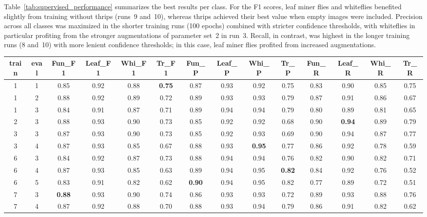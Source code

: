 \documentclass[12pt,a4paper]{article}
\begin{document}
Table~\ref{tab:supervised_performance} summarizes the best results per class. For the F1 scores, leaf miner flies and whiteflies benefited slightly from training without thrips (runs~9 and~10), whereas thrips achieved their best value when empty images were included. Precision across all classes was maximized in the shorter training runs (100 epochs) combined with stricter confidence thresholds, with whiteflies in particular profiting from the stronger augmentations of parameter set~2 in run~3. Recall, in contrast, was highest in the longer training runs (8 and~10) with more lenient confidence thresholds; in this case, leaf miner flies profited from increased augmentations. 

\begin{landscape}
\begin{table}[h!]
\centering
\begin{tabular}{cccccccccccccc}
\hline
train & eval & Fun\_F1 & Leaf\_F1 & Whi\_F1 & Tr\_F1 & Fun\_P & Leaf\_P & Whi\_P & Tr\_P & Fun\_R & Leaf\_R & Whi\_R & Tr\_R \\
\hline
1 & 1 & 0.85 & 0.92 & 0.88 & \textbf{0.75} & 0.87 & 0.93 & 0.92 & 0.75 & 0.83 & 0.90 & 0.85 & 0.75 \\
1 & 2 & 0.88 & 0.92 & 0.89 & 0.72 & 0.89 & 0.93 & 0.93 & 0.79 & 0.87 & 0.91 & 0.86 & 0.67 \\
1 & 3 & 0.84 & 0.91 & 0.87 & 0.71 & 0.89 & 0.94 & 0.94 & 0.79 & 0.80 & 0.89 & 0.81 & 0.65 \\
2 & 3 & 0.88 & 0.93 & 0.90 & 0.73 & 0.85 & 0.92 & 0.92 & 0.68 & 0.90 & \textbf{0.94} & 0.89 & 0.79 \\
3 & 3 & 0.87 & 0.93 & 0.90 & 0.73 & 0.85 & 0.92 & 0.93 & 0.69 & 0.90 & 0.94 & 0.87 & 0.77 \\
3 & 4 & 0.87 & 0.93 & 0.85 & 0.67 & 0.88 & 0.93 & \textbf{0.95} & 0.77 & 0.86 & 0.92 & 0.78 & 0.59 \\
6 & 3 & 0.84 & 0.92 & 0.87 & 0.73 & 0.88 & 0.94 & 0.94 & 0.76 & 0.82 & 0.90 & 0.82 & 0.71 \\
6 & 4 & 0.87 & 0.93 & 0.85 & 0.63 & 0.89 & 0.94 & 0.95 & \textbf{0.82} & 0.84 & 0.92 & 0.76 & 0.52 \\
6 & 5 & 0.83 & 0.91 & 0.82 & 0.62 & \textbf{0.90} & 0.94 & 0.95 & 0.82 & 0.77 & 0.89 & 0.72 & 0.51 \\
7 & 3 & \textbf{0.88} & 0.93 & 0.90 & 0.74 & 0.86 & 0.93 & 0.93 & 0.72 & 0.89 & 0.93 & 0.88 & 0.76 \\
7 & 4 & 0.87 & 0.92 & 0.88 & 0.70 & 0.88 & 0.93 & 0.94 & 0.79 & 0.86 & 0.91 & 0.82 & 0.62 \\

\end{tabular}
\end{table}
\end{landscape}
\end{document}
